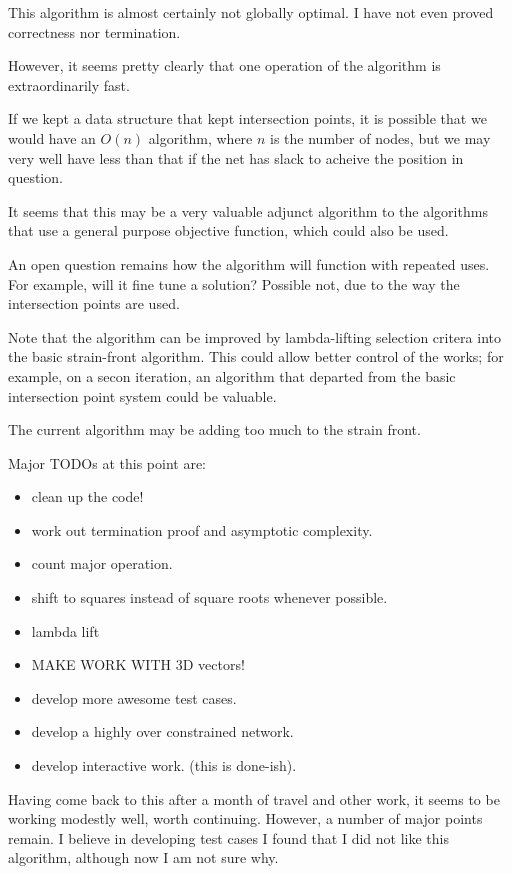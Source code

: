 \documentclass[11pt]{article}
\begin{document}
This algorithm is almost certainly not globally optimal.  I have not even proved correctness
nor termination.

However, it seems pretty clearly that one operation of the algorithm is extraordinarily fast.

If we kept a data structure that kept intersection points, it is possible that we would
have an $O(n)$ algorithm, where $n$ is the number of nodes, but we may very well have
less than that if the net has slack to acheive the position in question.

It seems that this may be a very valuable adjunct algorithm to the algorithms that
use a general purpose objective function, which could also be used.

An open question remains how the algorithm will function with repeated uses.
For example, will it fine tune a solution?  Possible not, due to the way the
intersection points are used.

Note that the algorithm can be improved by lambda-lifting selection critera into
the basic strain-front algorithm. This could allow better control of the  works;
for example, on a secon iteration, an algorithm that departed from the basic
intersection point system could be valuable.

The current algorithm may be adding too much to the strain front.

Major TODOs at this point are:
\begin{itemize}
\item clean up the code!
\item work out termination proof and asymptotic complexity.
\item count major operation.
\item shift to squares instead of square roots whenever possible.
\item lambda lift
\item MAKE WORK WITH 3D vectors!
\item develop more awesome test cases.
  \item develop a highly over constrained network.
  \item develop interactive work. (this is done-ish).
\end{itemize}

Having come back to this after a month of travel and other work, it seems to be
working modestly well, worth continuing. However, a number of major points remain.
I believe in developing test cases I found that I did not like this algorithm,
although now I am not sure why.
\end{document}
